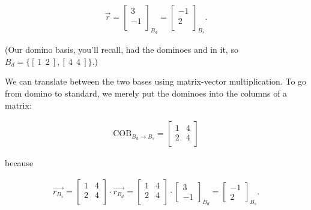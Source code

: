 \vspace{-.15in}
\begin{align*}
\overrightarrow{r} =
\begin{bmatrix} 3 \\ -1 \\ \end{bmatrix}_{B_d} =
\begin{bmatrix} -1 \\ 2 \\ \end{bmatrix}_{B_s}.
\end{align*}
\vspace{-.15in}

(Our domino basis, you'll recall, had the dominoes
and
 in
it, so $B_d = \{ [\ 1\ \ 2\ ], [\ 4\ \ 4\ ] \}$.)

We can translate between the two bases using matrix-vector multiplication. To
go from domino to standard, we merely put the dominoes into the columns of a
matrix:

\vspace{-.15in}
\begin{align*}
\textrm{COB}_{B_d \rightarrow B_s} =
\begin{bmatrix}
1 & 4 \\
2 & 4 \\
\end{bmatrix}
\end{align*}
\vspace{-.15in}

because

\vspace{-.15in}
\begin{align*}
\overrightarrow{r_{B_s}} =
\begin{bmatrix}
1 & 4 \\
2 & 4 \\
\end{bmatrix} \cdot
\overrightarrow{r_{B_d}} =
\begin{bmatrix}
1 & 4 \\
2 & 4 \\
\end{bmatrix} \cdot
\begin{bmatrix} 3 \\ -1 \end{bmatrix}_{B_d} =
\begin{bmatrix} -1 \\ 2 \end{bmatrix}_{B_s}.
\end{align*}
\vspace{-.15in}

